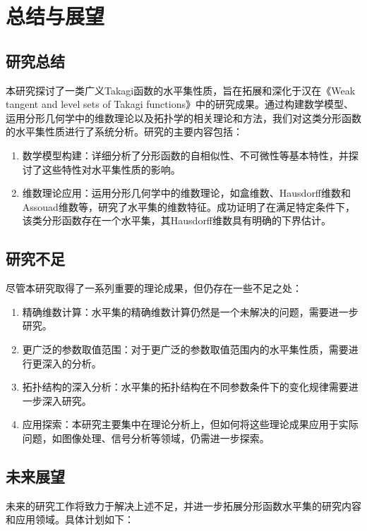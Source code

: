 \newpage
\section{总结与展望}
\subsection{研究总结}
本研究探讨了一类广义Takagi函数的水平集性质，旨在拓展和深化于汉在《Weak tangent and level sets of Takagi functions》中的研究成果。通过构建数学模型、运用分形几何学中的维数理论以及拓扑学的相关理论和方法，我们对这类分形函数的水平集性质进行了系统分析。研究的主要内容包括：

\begin{enumerate}
      \item 数学模型构建：详细分析了分形函数的自相似性、不可微性等基本特性，并探讨了这些特性对水平集性质的影响。
      \item 维数理论应用：运用分形几何学中的维数理论，如盒维数、Hausdorff维数和Assouad维数等，研究了水平集的维数特征。成功证明了在满足特定条件下，该类分形函数存在一个水平集，其Hausdorff维数具有明确的下界估计。
\end{enumerate}



\subsection{研究不足}
尽管本研究取得了一系列重要的理论成果，但仍存在一些不足之处：

\begin{enumerate}
      \item 精确维数计算：水平集的精确维数计算仍然是一个未解决的问题，需要进一步研究。
      \item 更广泛的参数取值范围：对于更广泛的参数取值范围内的水平集性质，需要进行更深入的分析。
      \item 拓扑结构的深入分析：水平集的拓扑结构在不同参数条件下的变化规律需要进一步深入研究。
      \item 应用探索：本研究主要集中在理论分析上，但如何将这些理论成果应用于实际问题，如图像处理、信号分析等领域，仍需进一步探索。
\end{enumerate}
\subsection{未来展望}
未来的研究工作将致力于解决上述不足，并进一步拓展分形函数水平集的研究内容和应用领域。具体计划如下：


